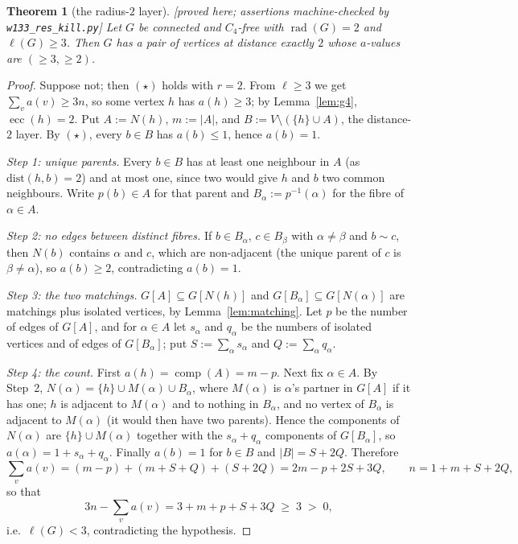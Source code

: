 \documentclass[11pt]{article}
\theoremstyle{plain}
\newtheorem{theorem}{Theorem}[section]
\theoremstyle{definition}
\theoremstyle{remark}
\numberwithin{equation}{section}
\newcommand{\rad}{\operatorname{rad}}
\newcommand{\ecc}{\operatorname{ecc}}
\newcommand{\comp}{\operatorname{comp}}
\newcommand{\statusbox}[1]{{\small\sloppy\textsf{[#1]}}}
\newcommand{\PRV}[1]{\statusbox{proved here; assertions machine-checked by \texttt{#1}}}
\begin{document}
\begin{theorem}[the radius-$2$ layer]\label{thm:g7}
\PRV{w133\_res\_kill.py}
Let $G$ be connected and $C_4$-free with $\rad(G) = 2$ and $\ell(G) \ge 3$. Then $G$ has a
pair of vertices at distance exactly $2$ whose $a$-values are $(\ge 3, \ge 2)$.
\end{theorem}

\begin{proof}
Suppose not; then $(\star)$ holds with $r = 2$. From $\ell \ge 3$ we get
$\sum_v a(v) \ge 3n$, so some vertex $h$ has $a(h) \ge 3$; by Lemma~\ref{lem:g4},
$\ecc(h) = 2$. Put $A := N(h)$, $m := |A|$, and $B := V \setminus (\{h\} \cup A)$, the
distance-$2$ layer. By $(\star)$, every $b \in B$ has $a(b) \le 1$, hence $a(b) = 1$.

\emph{Step 1: unique parents.} Every $b \in B$ has at least one neighbour in $A$ (as
$\mathrm{dist}(h,b) = 2$) and at most one, since two would give $h$ and $b$ two common
neighbours. Write $p(b) \in A$ for that parent and $B_\alpha := p^{-1}(\alpha)$ for the fibre
of $\alpha \in A$.

\emph{Step 2: no edges between distinct fibres.} If $b \in B_\alpha$, $c \in B_\beta$ with
$\alpha \ne \beta$ and $b \sim c$, then $N(b)$ contains $\alpha$ and $c$, which are
non-adjacent (the unique parent of $c$ is $\beta \ne \alpha$), so $a(b) \ge 2$, contradicting
$a(b) = 1$.

\emph{Step 3: the two matchings.} $G[A] \subseteq G[N(h)]$ and
$G[B_\alpha] \subseteq G[N(\alpha)]$ are matchings plus isolated vertices, by
Lemma~\ref{lem:matching}. Let $p$ be the number of edges of $G[A]$, and for
$\alpha \in A$ let $s_\alpha$ and $q_\alpha$ be the numbers of isolated vertices and of edges
of $G[B_\alpha]$; put $S := \sum_\alpha s_\alpha$ and $Q := \sum_\alpha q_\alpha$.

\emph{Step 4: the count.} First $a(h) = \comp(A) = m - p$. Next fix $\alpha \in A$. By
Step~2, $N(\alpha) = \{h\} \cup M(\alpha) \cup B_\alpha$, where $M(\alpha)$ is $\alpha$'s
partner in $G[A]$ if it has one; $h$ is adjacent to $M(\alpha)$ and to nothing in
$B_\alpha$, and no vertex of $B_\alpha$ is adjacent to $M(\alpha)$ (it would then have two
parents). Hence the components of $N(\alpha)$ are $\{h\} \cup M(\alpha)$ together with the
$s_\alpha + q_\alpha$ components of $G[B_\alpha]$, so
$a(\alpha) = 1 + s_\alpha + q_\alpha$. Finally $a(b) = 1$ for $b \in B$ and
$|B| = S + 2Q$. Therefore
\[
  \sum_v a(v) = (m-p) + (m + S + Q) + (S+2Q) = 2m - p + 2S + 3Q,
  \qquad n = 1 + m + S + 2Q,
\]
so that
\[
  3n - \sum_v a(v) = 3 + m + p + S + 3Q \;\ge\; 3 \;>\; 0,
\]
i.e.\ $\ell(G) < 3$, contradicting the hypothesis.
\end{proof}
\end{document}
